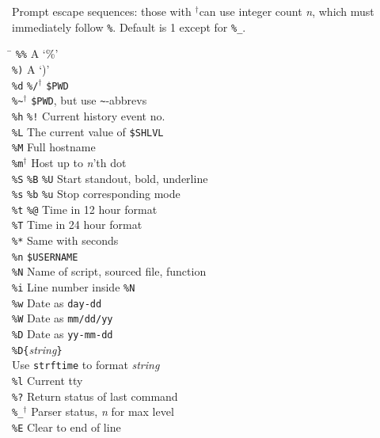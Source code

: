 \documentclass{article}
\newcommand\I[1]{\textsl{#1}}
\newcommand\T[1]{\texttt{#1}}
\newcommand\D{$^\dag$}
\begin{document}
Prompt escape sequences: those with \D can use integer count \I{n},
which must immediately follow \verb!%!.  Default is 1 except for \verb!%_!.
\begin{multicols}{3}
\begin{tabbing}
\hskip 50pt \= \kill
\verb!%%!          \> A `\%' \\
\verb!%)!          \> A `)' \\
\verb!%d! \verb!%/!\D
                   \> \verb!$PWD! \\
\verb!%~!\D        \> \verb!$PWD!, but use \verb!~!-abbrevs \\
\verb!%h! \verb.%!.
                   \> Current history event no. \\
\verb!%L!          \> The current value of \verb!$SHLVL! \\
\verb!%M!          \> Full hostname \\
\verb!%m!\D        \> Host up to \I{n}'th dot \\
\verb!%S! \verb!%B! \verb!%U!
                   \> Start standout, bold, underline \\
\verb!%s! \verb!%b! \verb!%u!
                   \> Stop corresponding mode \\
\verb!%t! \verb!%@!
                   \> Time in 12 hour format \\
\verb!%T!          \> Time in 24 hour format  \\
\verb!%*!          \> Same with seconds \\
\verb!%n!          \> \verb!$USERNAME! \\
\verb!%N!          \> Name of script, sourced file, function \\
\verb!%i!          \> Line number inside \verb!%N! \\
\verb!%w!          \> Date as \verb!day-dd! \\
\verb!%W!          \> Date as \verb!mm/dd/yy! \\
\verb!%D!          \> Date as \verb!yy-mm-dd! \\
\verb!%D{!\I{string}\verb!}! \\
                   \> Use \T{strftime} to format \I{string} \\
\verb!%l!          \> Current tty \\
\verb!%?!          \> Return status of last command \\
\verb!%_!\D        \> Parser status, \I{n} for max level\\
\verb!%E!          \> Clear to end of line \\

\end{tabbing}
\end{multicols}
\end{document}

